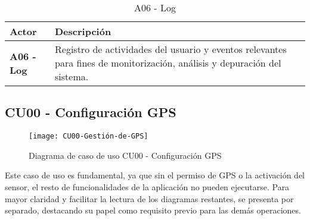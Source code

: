 \begin{table}[H]
	\centering
	\begin{tabularx}{\linewidth}{ p{} p{} }
		\toprule
		\textbf{Actor} & \textbf{Descripción} \\
		\midrule
		\textbf{A06 - Log} & Registro de actividades del usuario y eventos relevantes para fines de monitorización, análisis y depuración del sistema. \\
		\bottomrule
	\end{tabularx}
	\caption{A06 - Log}
\end{table}



\subsection{CU00 - Configuración GPS}
\begin{figure}[H]
	\centering
	\texttt{[image: CU00-Gestión-de-GPS]}
	\caption{Diagrama de caso de uso CU00 - Configuración GPS}
	\label{fig:CU00-Gestión-de-GPS}
\end{figure}

Este caso de uso es fundamental, ya que sin el permiso de GPS o la activación del sensor, el resto de funcionalidades de la aplicación no pueden ejecutarse. Para mayor claridad y facilitar la lectura de los diagramas restantes, se presenta por separado, destacando su papel como requisito previo para las demás operaciones.

